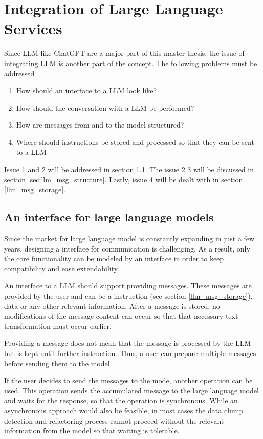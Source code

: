 \section{Integration of Large Language Services}

Since \ac{LLM} like ChatGPT are a major part of this master thesis, the issue of integrating \ac{LLM} is another part of the concept. The following problems must be addressed
\begin{enumerate}
    \item How should an interface to a \ac{LLM} look like?
    \item How should the conversation with a \ac{LLM} be performed?
    \item How are messages from and to the model structured?
    \item Where should instructions be stored and processed so that they can be sent to a \ac{LLM}
\end{enumerate}
Issue 1 and 2 will be addressed in section \ref{sec:llm_interface}. The issue 2 3 will be discussed in section \ref{sec:llm_msg_structure}. Lastly, issue 4 will be dealt with in section \ref{llm_msg_storage}.
\subsection{An interface for large language models}\label{sec:llm_interface}

Since the market for large language model is constantly expanding in just a few years, designing a interface for communication is challenging. As a result, only the core functionality can be modeled by an interface in order to keep compatibility and ease extendability. 

An interface to a \ac{LLM} should support providing messages. These messages are provided by the user and can be a instruction (see  section \ref{llm_msg_storage}), data or any other relevant information. After a message is stored,  no modifications of the message content can occur so that that necessary text transformation must occur earlier. 

Providing a message does not mean that the message is processed by the \ac{LLM} but is kept until further instruction. Thus, a user can prepare multiple messages before sending them to the model.

If the user decides to send the messages to the mode, another operation can be used. This operation sends the accumulated message to the large language model and waits for the response, so that the operation is synchronous. While an asynchronous approach would also be feasible, in most cases the data clump detection and refactoring process cannot proceed without the relevant information from the model so that waiting is tolerable. 

